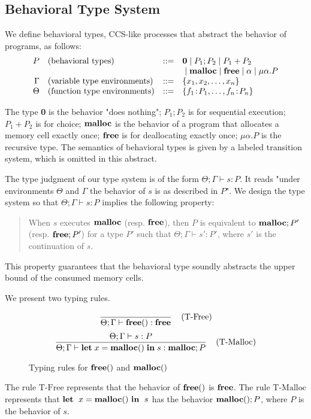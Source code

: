 \documentclass{sigplanconf}
\begin{document}
\subsection{Behavioral Type System}
 We define behavioral types, CCS-like processes that abstract the
 behavior of programs, as follows:
\[
\begin{array}{rlcl}
  P & (\mbox{behavioral types})&::=& {\bf 0} \;|\; P_{1};P_{2} \;|\; P_{1}+P_{2} \\
     & & & \;|\; \mathbf{malloc} \;|\; \mathbf{free} \;|\; \alpha \;|\; \mu\alpha.P \\
  \Gamma & (\mbox{variable type environments}) &::=& \{x_1, x_2, \dots, x_n\}\\
  \Theta & (\mbox{function type environments}) &::=& \{f_1\!:\! P_1,\dots,f_n\!:\! P_n\}\\
\end{array}
\]

The type {\bf 0} is the behavior "does nothing"; $P_{1};P_{2}$ is for
sequential execution; $P_{1}+P_{2}$ is for choice; $\mathbf{malloc}$ is the
behavior of a program that allocates a memory cell exactly once;
$\mathbf{free}$ is for deallocating exactly once; $\mu\alpha.P$ is the
recursive type.  The semantics of behavioral types is given by a
labeled transition system, which is omitted in this abstract.

The type judgment of our type system is of the form $\Theta;\Gamma\vdash s :
P$.  It reads "under environments \(\Theta\) and  \(\Gamma\) the behavior
of \(s\) is as described in \(P\)".  We design the type system so that
\(\Theta;\Gamma \vdash s : P\) implies the following property:
\begin{quotation}
When \(s\) executes \(\mathbf{malloc}\) (resp. \(\mathbf{free}\)), then \(P\) is
equivalent to \(\mathbf{malloc};P'\) (resp. \(\mathbf{free};P'\)) for a type \(P'\)
such that \(\Theta;\Gamma \vdash s' : P'\), where \(s'\) is the continuation
of \(s\).
\end{quotation}
This property guarantees that the behavioral type soundly abstracts
the upper bound of the consumed memory cells.

We present two typing rules. 
\begin{figure}[t]
$$ \frac{}
{\Theta;\Gamma \vdash \mathbf{free}() : \mathbf{free}} 
\; \; \; \; \mbox{(T-Free)} $$
$$ \frac{\Theta;\Gamma \vdash s : P}
{\Theta;\Gamma \vdash \mathbf{let}\; x = \mathbf{malloc()} \; \mathbf{in}\; s  : \mathbf{malloc};P} 
\; \; \; \; \mbox{(T-Malloc)} $$
\caption{Typing rules for $\mathbf{free}()$ and $\mathbf{malloc()}$ }
\end{figure}
The rule $\mbox{T-Free}$ represents that the behavior of \(\mathbf{free}()\)
is \(\mathbf{free}\). The rule $\mbox{T-Malloc}$ represents that \(\mathbf{let}\;\ x =
\mathbf{malloc()}\ \mathbf{in}\;\ s\) has the behavior \(\mathbf{malloc()};P\), where \(P\) is the
behavior of \(s\).
\end{document}
